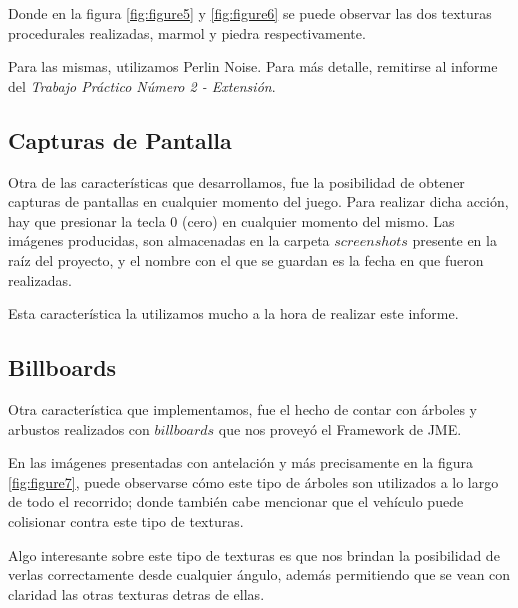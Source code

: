 \documentclass[a4paper,10pt]{article}
\begin{document}
Donde en la figura \ref{fig:figure5} y \ref{fig:figure6} se puede observar las
dos texturas procedurales realizadas, marmol y piedra respectivamente.

Para las mismas, utilizamos Perlin Noise.  Para m\'as detalle,
remitirse al informe del \textit{Trabajo Pr\'actico N\'umero 2 - Extensi\'on}.

\subsection{Capturas de Pantalla}

Otra de las caracter\'isticas que desarrollamos, fue la posibilidad de obtener
capturas de pantallas en cualquier momento del juego.  Para realizar dicha
acci\'on, hay que presionar la tecla $0$ (cero) en cualquier momento del
mismo.
Las im\'agenes producidas, son almacenadas en la carpeta $screenshots$
presente en la ra\'iz del proyecto, y el
nombre
con el que se guardan es la fecha en que fueron realizadas.

Esta caracter\'istica la utilizamos mucho a la hora de realizar este informe.

\subsection{Billboards}

Otra caracter\'istica que implementamos, fue el hecho de contar con \'arboles y
arbustos realizados con $billboards$ que nos provey\'o el Framework de JME.

En las im\'agenes presentadas con antelaci\'on y m\'as precisamente en la figura
\ref{fig:figure7}, puede observarse c\'omo este tipo de \'arboles son utilizados
a lo largo de todo el recorrido; donde tambi\'en cabe mencionar que el
veh\'iculo
puede colisionar contra este tipo de texturas.

Algo interesante sobre este tipo de texturas es que nos brindan la posibilidad
de verlas correctamente desde cualquier \'angulo, adem\'as permitiendo que se
vean con claridad las otras texturas detras de ellas.
\end{document}
